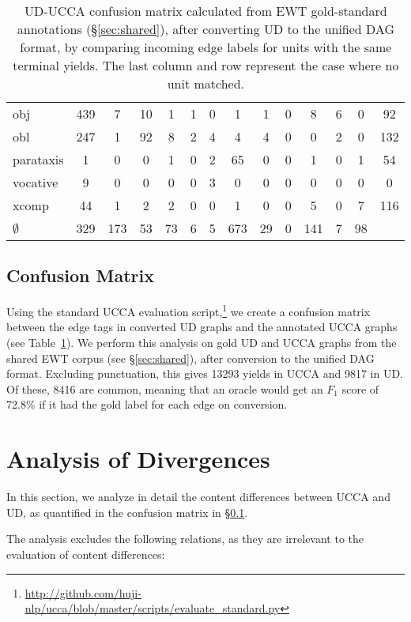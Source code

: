 \documentclass[11pt,a4paper]{article}
\begin{document}
\begin{table}[t]
\begin{tabular}{l|ccccccccccccc}
obj & 439 & 7 & 10 & 1 & 1 & 0 & 1 & 1 & 0 & 8 & 6 & 0 & 92 \\
obl & 247 & 1 & 92 & 8 & 2 & 4 & 4 & 4 & 0 & 0 & 2 & 0 & 132 \\
parataxis & 1 & 0 & 0 & 1 & 0 & 2 & 65 & 0 & 0 & 1 & 0 & 1 & 54 \\
vocative & 9 & 0 & 0 & 0 & 0 & 3 & 0 & 0 & 0 & 0 & 0 & 0 & 0 \\
xcomp & 44 & 1 & 2 & 2 & 0 & 0 & 1 & 0 & 0 & 5 & 0 & 7 & 116 \\
$\emptyset$ & 329 & 173 & 53 & 73 & 6 & 5 & 673 & 29 & 0 & 141 & 7 & 98
\end{tabular}
\caption{UD-UCCA confusion matrix calculated from EWT
gold-standard annotations (\S\ref{sec:shared}),
after converting UD to the unified DAG format,
by comparing incoming edge labels for units with the same terminal yields.
The last column and row represent the case where no unit matched.
\label{tab:confusion_matrix}}
\end{table}

\subsection{Confusion Matrix}\label{sec:confusion}

Using the standard UCCA evaluation
script,\footnote{\url{http://github.com/huji-nlp/ucca/blob/master/scripts/evaluate_standard.py}}
we create a confusion matrix between the edge tags in converted UD graphs
and the annotated UCCA graphs (see Table~\ref{tab:confusion_matrix}).
We perform this analysis on gold UD and UCCA graphs from the shared EWT corpus
(see \S\ref{sec:shared}),
after conversion to the unified DAG format.
Excluding punctuation, this gives 13293 yields in UCCA and
9817 in UD.
Of these, 8416 are common, meaning that an oracle would get an $F_1$ score
of 72.8\% if it had the gold label for each edge on conversion.


\section{Analysis of Divergences}\label{sec:analysis}

In this section, we analyze in detail the content differences between UCCA and UD,
as quantified in the confusion matrix in \S\ref{sec:confusion}.

The analysis excludes the following relations,
as they are irrelevant to the evaluation of content differences:
\end{document}
